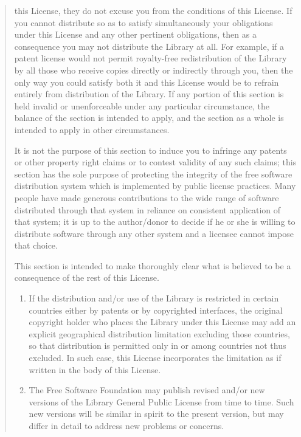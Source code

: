 \documentclass[
]{book}
\theoremstyle{definition}
\theoremstyle{definition}
\theoremstyle{definition}
\theoremstyle{definition}
\theoremstyle{remark}
\begin{document}
\begin{quote}
\begin{enumerate}
  this License, they do not excuse you from the conditions of this
  License. If you cannot distribute so as to satisfy
  simultaneously your obligations under this License and any other
  pertinent obligations, then as a consequence you may not
  distribute the Library at all. For example, if a patent license
  would not permit royalty-free redistribution of the Library by
  all those who receive copies directly or indirectly through you,
  then the only way you could satisfy both it and this License
  would be to refrain entirely from distribution of the Library.
  If any portion of this section is held invalid or unenforceable
  under any particular circumstance, the balance of the section is
  intended to apply, and the section as a whole is intended to
  apply in other circumstances.
\end{enumerate}

It is not the purpose of this section to induce you to infringe
any patents or other property right claims or to contest
validity of any such claims; this section has the sole purpose
of protecting the integrity of the free software distribution
system which is implemented by public license practices. Many
people have made generous contributions to the wide range of
software distributed through that system in reliance on
consistent application of that system; it is up to the
author/donor to decide if he or she is willing to distribute
software through any other system and a licensee cannot impose
that choice.

This section is intended to make thoroughly clear what is
believed to be a consequence of the rest of this License.

\begin{enumerate}
\def\labelenumi{\arabic{enumi}.}
\setcounter{enumi}{11}
\item
  If the distribution and/or use of the Library is restricted
  in certain countries either by patents or by copyrighted
  interfaces, the original copyright holder who places the Library
  under this License may add an explicit geographical distribution
  limitation excluding those countries, so that distribution is
  permitted only in or among countries not thus excluded. In such
  case, this License incorporates the limitation as if written in
  the body of this License.
\item
  The Free Software Foundation may publish revised and/or new
  versions of the Library General Public License from time to
  time. Such new versions will be similar in spirit to the present
  version, but may differ in detail to address new problems or
  concerns.
\end{enumerate}


\end{quote}
\end{document}
